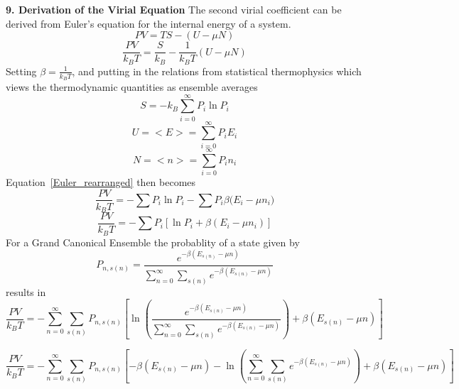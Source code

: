 \documentclass[double,12pt]{beavtex}
\begin{document}
\noindent \textbf{9. Derivation of the Virial Equation}
The second virial coefficient can be derived from Euler's equation for the internal energy of a system.
\begin{equation}PV=TS-(U-\mu{N})\end{equation}
\begin{equation}\label{Euler_rearranged}\frac{PV}{k_BT}=\frac{S}{k_B}-\frac{1}{k_BT}(U-\mu{N})\end{equation}
Setting $\beta=\frac{1}{k_BT}$, and putting in the relations from statistical thermophysics which views the 
thermodynamic quantities as ensemble averages
\begin{equation}S=-k_B\sum_{i=0}^\infty{P_i\ln{P_i}}\end{equation}
\begin{equation}U=<E>=\sum_{i=0}^\infty{P_iE_i}\end{equation}
\begin{equation}N=<n>=\sum_{i=0}^\infty{P_in_i}\end{equation}
Equation~\ref{Euler_rearranged} then becomes
\begin{equation}\frac{PV}{k_BT}=-\sum{P_i\ln{P_i}}-\sum{P_i\beta(E_i-\mu
{n_i}})\end{equation}
\begin{equation}\frac{PV}{k_BT}=-\sum{P_i}\left[\ln{P_i}+\beta(E_i-\mu
{n_i})\right]\end{equation}
For a Grand Canonical Ensemble the probablity of a state given by
\begin{equation}P_{n,s(n)}=\frac{e^{-\beta(E_{s(n)}-\mu{n})}}{\sum_{n=0}^\infty\sum_{s(n)}e^{-\beta(E_{s(n)}-\mu{n})}}\end{equation}
results in 
\begin{equation}\frac{PV}{k_BT}=-\sum_{n=0}^\infty\sum_{s(n)}P_{n,s(n)}\left[\ln{\left(\frac{ e^{-\beta(E_{s(n)}-\mu{n})}}{\sum_{n=0}^\infty\sum_{s(n)}e^{-\beta(E_{s(n)}-\mu{n})}}\right)}+\beta(E_{s(n)}-\mu{n})\right]\end{equation}

\begin{equation}\frac{PV}{k_BT}=-\sum_{n=0}^\infty\sum_{s(n)}P_{n,s(n)}\left[-\beta(E_{s(n)}-\mu{n})-\ln{\left(\sum_{n=0}^\infty\sum_{s(n)}e^{-\beta(E_{s(n)}-\mu{n})}\right)}+\beta(E_{s(n)}-\mu{n})\right]\end{equation}
\end{document}
